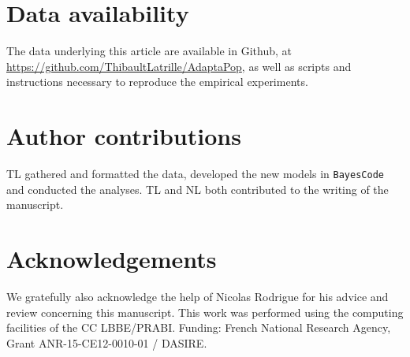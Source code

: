\documentclass{article}
\begin{document}
\section{Data availability}
The data underlying this article are available in Github, at \url{https://github.com/ThibaultLatrille/AdaptaPop}, as well as scripts and instructions necessary to reproduce the empirical experiments.

\section{Author contributions}
TL gathered and formatted the data, developed the new models in \texttt{BayesCode} and conducted the analyses.
TL and NL both contributed to the writing of the manuscript.

\section{Acknowledgements}
We gratefully also acknowledge the help of Nicolas Rodrigue for his advice and review concerning this manuscript.
This work was performed using the computing facilities of the CC LBBE/PRABI.
Funding: French National Research Agency, Grant ANR-15-CE12-0010-01 / DASIRE.



\end{document}
